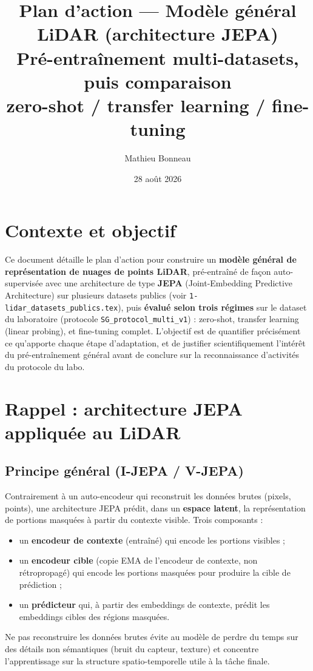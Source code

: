 \documentclass[11pt]{article}
\title{Plan d'action --- Modèle général LiDAR (architecture JEPA) \\
\large Pré-entraînement multi-datasets, puis comparaison \\
zero-shot / transfer learning / fine-tuning}
\author{Mathieu Bonneau}
\date{28 août 2026}
\begin{document}
\maketitle

\section*{Contexte et objectif}

Ce document détaille le plan d'action pour construire un \textbf{modèle général de
représentation de nuages de points LiDAR}, pré-entraîné de façon auto-supervisée avec une
architecture de type \textbf{JEPA} (Joint-Embedding Predictive Architecture) sur plusieurs
datasets publics (voir \texttt{1-lidar\_datasets\_publics.tex}), puis \textbf{évalué selon
trois régimes} sur le dataset du laboratoire (protocole \texttt{SG\_protocol\_multi\_v1}) :
zero-shot, transfer learning (linear probing), et fine-tuning complet. L'objectif est de
quantifier précisément ce qu'apporte chaque étape d'adaptation, et de justifier scientifiquement
l'intérêt du pré-entraînement général avant de conclure sur la reconnaissance d'activités du
protocole du labo.

\section{Rappel : architecture JEPA appliquée au LiDAR}

\subsection{Principe général (I-JEPA / V-JEPA)}

Contrairement à un auto-encodeur qui reconstruit les données brutes (pixels, points), une
architecture JEPA prédit, dans un \textbf{espace latent}, la représentation de portions
masquées à partir du contexte visible. Trois composants :
\begin{itemize}
    \item un \textbf{encodeur de contexte} (entraîné) qui encode les portions visibles ;
    \item un \textbf{encodeur cible} (copie EMA de l'encodeur de contexte, non rétropropagé)
    qui encode les portions masquées pour produire la cible de prédiction ;
    \item un \textbf{prédicteur} qui, à partir des embeddings de contexte, prédit les
    embeddings cibles des régions masquées.
\end{itemize}
Ne pas reconstruire les données brutes évite au modèle de perdre du temps sur des détails
non sémantiques (bruit du capteur, texture) et concentre l'apprentissage sur la structure
spatio-temporelle utile à la tâche finale.
\end{document}
